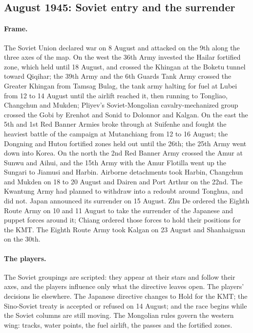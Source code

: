 \documentclass[11pt]{article}
\begin{document}
\subsection{August 1945: Soviet entry and the surrender}\label{sub:sc-august}
\paragraph{Frame.} The Soviet Union declared war on 8 August and attacked on the 9th along the three axes of the map. On the west the 36th Army invested the Hailar fortified zone, which held until 18 August, and crossed the Khingan at the Boketu tunnel toward Qiqihar; the 39th Army and the 6th Guards Tank Army crossed the Greater Khingan from Tamsag Bulag, the tank army halting for fuel at Lubei from 12 to 14 August until the airlift reached it, then running to Tongliao, Changchun and Mukden; Pliyev's Soviet-Mongolian cavalry-mechanized group crossed the Gobi by Erenhot and Sonid to Dolonnor and Kalgan. On the east the 5th and 1st Red Banner Armies broke through at Suifenhe and fought the heaviest battle of the campaign at Mutanchiang from 12 to 16 August; the Dongning and Hutou fortified zones held out until the 26th; the 25th Army went down into Korea. On the north the 2nd Red Banner Army crossed the Amur at Sunwu and Aihui, and the 15th Army with the Amur Flotilla went up the Sungari to Jiamusi and Harbin. Airborne detachments took Harbin, Changchun and Mukden on 18 to 20 August and Dairen and Port Arthur on the 22nd. The Kwantung Army had planned to withdraw into a redoubt around Tonghua, and did not. Japan announced its surrender on 15 August. Zhu De ordered the Eighth Route Army on 10 and 11 August to take the surrender of the Japanese and puppet forces around it; Chiang ordered those forces to hold their positions for the KMT. The Eighth Route Army took Kalgan on 23 August and Shanhaiguan on the 30th.
\paragraph{The players.} The Soviet groupings are scripted: they appear at their stars and follow their axes, and the players influence only what the directive leaves open. The players' decisions lie elsewhere. The Japanese directive changes to Hold for the KMT; the Sino-Soviet treaty is accepted or refused on 14 August; and the race begins while the Soviet columns are still moving. The Mongolian rules govern the western wing: tracks, water points, the fuel airlift, the passes and the fortified zones.
\end{document}

